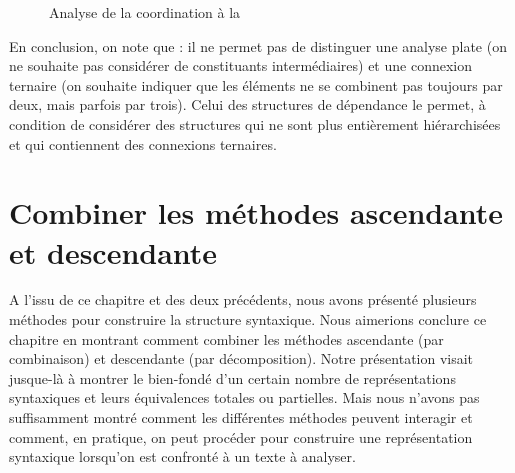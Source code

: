 {\begin{figure}[H]
\caption{\label{fig:hockett-coord}Analyse de la coordination à la \citet{hockett1958course}}
\end{figure}


    En conclusion, on note que : il ne permet pas de distinguer une analyse plate (on ne souhaite pas considérer de constituants intermédiaires) et une connexion ternaire (on souhaite indiquer que les éléments ne se combinent pas toujours par deux, mais parfois par trois). Celui des structures de dépendance le permet, à condition de considérer des structures qui ne sont plus entièrement hiérarchisées et qui contiennent des connexions ternaires.
}
\section{Combiner les méthodes ascendante et descendante}\label{sec:3.4.27}\largerpage

A l’issu de ce chapitre et des deux précédents, nous avons présenté plusieurs méthodes pour construire la structure syntaxique. Nous aimerions conclure ce chapitre en montrant comment combiner les méthodes ascendante (par combinaison) et descendante (par décomposition). Notre présentation visait jusque-là à montrer le bien-fondé d’un certain nombre de représentations syntaxiques et leurs équivalences totales ou partielles. Mais nous n’avons pas suffisamment montré comment les différentes méthodes peuvent interagir et comment, en pratique, on peut procéder pour construire une représentation syntaxique lorsqu’on est confronté à un texte à analyser.


